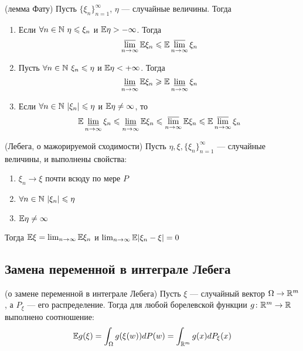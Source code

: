\begin{theorem} (лемма Фату)
	Пусть $\{\xi_n\}_{n = 1}^\infty$, $\eta$ --- случайные величины. Тогда
	\begin{enumerate}
		\item Если $\forall n \in \mathbb{N}\ \eta \leqslant \xi_n$ и $\mathbb{E}\eta > -\infty$. Тогда
		\[
		\varlimsup_{n \to \infty} \mathbb{E}\xi_n \leqslant \mathbb{E} \varlimsup_{n \to \infty} \xi_n
		\]
		
		\item Пусть $\forall n \in \mathbb{N}\ \xi_n \leqslant \eta$ и $\mathbb{E}\eta < +\infty$. Тогда
		\[
		\varliminf_{n \to \infty} \mathbb{E}\xi_n \geqslant \mathbb{E} \varliminf_{n \to \infty} \xi_n
		\]
		
		\item Если $\forall n \in \mathbb{N}\ |\xi_n| \leqslant \eta$ и $\mathbb{E}\eta \neq \infty$, то
		\[
		\mathbb{E} \varliminf_{n \to \infty} \xi_n \leqslant \varliminf_{n \to \infty} \mathbb{E}\xi_n \leqslant \varlimsup_{n \to \infty} \mathbb{E}\xi_n \leqslant \mathbb{E} \varlimsup_{n \to \infty} \xi_n
		\]
	\end{enumerate}
\end{theorem}

\begin{theorem} (Лебега, о мажорируемой сходимости)
	Пусть $\eta, \xi, \{\xi_n\}_{n = 1}^\infty$ --- случайные величины, и выполнены свойства:
	\begin{enumerate}
		\item $\xi_n \to \xi$ почти всюду по мере $P$
		
		\item $\forall n \in \mathbb{N}\ |\xi_n| \leqslant \eta$
		
		\item $\mathbb{E}\eta \neq \infty$
	\end{enumerate}
	Тогда $\mathbb{E}\xi = \lim_{n \to \infty} \mathbb{E}\xi_n$ и $\lim_{n \to \infty} \mathbb{E} |\xi_n - \xi| = 0$
\end{theorem}

\subsection{Замена переменной в интеграле Лебега}

\begin{theorem} (о замене переменной в интеграле Лебега)
	Пусть $\xi$ --- случайный вектор $\Omega \to \mathbb{R}^m$, а $P_\xi$ --- его распределение. Тогда для любой борелевской функции $g \colon \mathbb{R}^m \to \mathbb{R}$ выполнено соотношение:
	\[
		\mathbb{E} g(\xi) = \int_\Omega g(\xi(w))dP(w) = \int_{\mathbb{R}^m} g(x) dP_\xi(x)
 	\]
\end{theorem}

